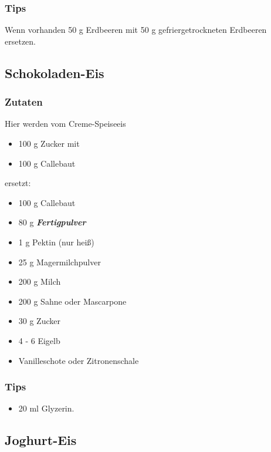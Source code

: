 \documentclass[12pt]{article}
\begin{document}
\subsubsection {Tips}
Wenn vorhanden 50 g Erdbeeren mit 50 g gefriergetrockneten Erdbeeren ersetzen. 

\subsection{Schokoladen-Eis}
\subsubsection {Zutaten}
	Hier werden vom Creme-Speiseeis 
	\begin{itemize}
	  \item 100 g Zucker mit
	  \item 100 g Callebaut
	\end{itemize}
	ersetzt:
	
	\begin{itemize}
		\item 100 g Callebaut
	\end{itemize}
	\begin{itemize}
		\item 80 g \textbf{\textit{Fertigpulver}}
	  	\item 1 g Pektin (nur heiß)
	  	\item 25 g Magermilchpulver
	\end{itemize}
	\begin{itemize}
	  	\item 200 g Milch 
	  	\item 200 g Sahne oder Mascarpone
	  	\item 30 g Zucker
	  	\item 4 - 6 Eigelb %
	  	\item Vanilleschote oder Zitronenschale
	\end{itemize}

\subsubsection{Tips}
\begin{itemize}
	  \item 20 ml Glyzerin.
\end{itemize}


\pagebreak
\subsection{Joghurt-Eis}
\end{document}
